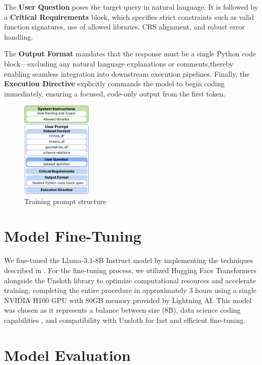 The \textbf{User Question} poses the target query in natural language. It is followed by a \textbf{Critical Requirements} block, which specifies strict constraints such as valid function signatures, use of allowed libraries, CRS alignment, and robust error handling.

The \textbf{Output Format} mandates that the response must be a single Python code block—excluding any natural language explanations or comments,thereby enabling seamless integration into downstream execution pipelines. Finally, the \textbf{Execution Directive} explicitly commands the model to begin coding immediately, ensuring a focused, code-only output from the first token.

\begin{figure}[hbtp]
  \centering
  \includegraphics[width=0.3\textwidth]{images/prompt.png}
  \caption{Training prompt structure}
  \label{fig:training_prompt_structure}
\end{figure}


\section{Model Fine-Tuning}

We fine-tuned the Llama-3.1-8B Instruct model \citep{Grattafiori2024Llama3, Unsloth2024WhatModel} by implementing the techniques described in \cite{Pareja2024RecipesSFT}. For the fine-tuning process, we utilized Hugging Face Transformers alongside the Unsloth library to optimize computational resources and accelerate training, completing the entire procedure in approximately 3 hours using a single NVIDIA H100 GPU with 80GB memory provided by Lightning AI. This model was chosen as it represents a balance between size (8B), data science coding capabilities \citep{Lai2022DS1000}, and compatibility with Unsloth for fast and efficient fine-tuning.



\section{Model Evaluation}

